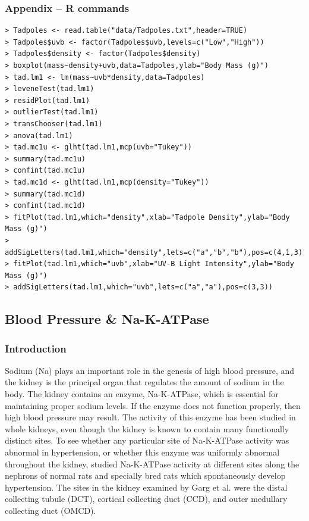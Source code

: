 \documentclass[10pt,openany]{book}\usepackage[]{graphicx}\usepackage[]{color}
\begin{document}
\subsubsection*{Appendix -- R commands}
\begin{Verbatim}[formatcom=\color{red},xleftmargin=5mm,commandchars=\\\{\}]
> Tadpoles <- read.table("data/Tadpoles.txt",header=TRUE)
> Tadpoles$uvb <- factor(Tadpoles$uvb,levels=c("Low","High"))
> Tadpoles$density <- factor(Tadpoles$density)
> boxplot(mass~density+uvb,data=Tadpoles,ylab="Body Mass (g)")
> tad.lm1 <- lm(mass~uvb*density,data=Tadpoles)
> leveneTest(tad.lm1)
> residPlot(tad.lm1)
> outlierTest(tad.lm1)
> transChooser(tad.lm1)
> anova(tad.lm1)
> tad.mc1u <- glht(tad.lm1,mcp(uvb="Tukey"))
> summary(tad.mc1u)
> confint(tad.mc1u)
> tad.mc1d <- glht(tad.lm1,mcp(density="Tukey"))
> summary(tad.mc1d)
> confint(tad.mc1d)
> fitPlot(tad.lm1,which="density",xlab="Tadpole Density",ylab="Body Mass (g)")
> addSigLetters(tad.lm1,which="density",lets=c("a","b","b"),pos=c(4,1,3))
> fitPlot(tad.lm1,which="uvb",xlab="UV-B Light Intensity",ylab="Body Mass (g)")
> addSigLetters(tad.lm1,which="uvb",lets=c("a","a"),pos=c(3,3))
\end{Verbatim}


\subsection{Blood Pressure \& Na-K-ATPase}
\subsubsection*{Introduction}

Sodium (Na) plays an important role in the genesis of high blood pressure, and the kidney is the principal organ that regulates the amount of sodium in the body.  The kidney contains an enzyme, Na-K-ATPase, which is essential for maintaining proper sodium levels.  If the enzyme does not function properly, then high blood pressure may result.  The activity of this enzyme has been studied in whole kidneys, even though the kidney is known to contain many functionally distinct sites.  To see whether any particular site of Na-K-ATPase activity was abnormal in hypertension, or whether this enzyme was uniformly abnormal throughout the kidney, \cite{Gargetal1985} studied Na-K-ATPase activity at different sites along the nephrons of normal rats and specially bred rats which spontaneously develop hypertension.  The sites in the kidney examined by Garg et al. were the distal collecting tubule (DCT), cortical collecting duct (CCD), and outer medullary collecting duct (OMCD).
\end{document}

